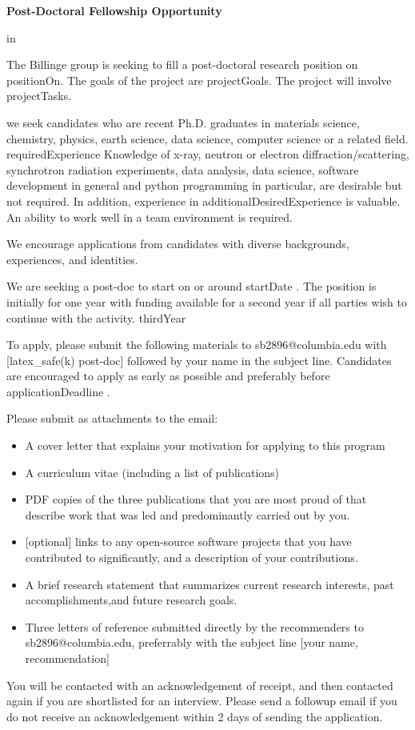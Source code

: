 \documentclass{letter}
\begin{document}
\begin{center}
 {\bf
  Post-Doctoral Fellowship Opportunity
 }
\end{center}
 in 

The Billinge group is seeking to fill a post-doctoral research position on {{positionOn}}.
The goals of the project are {{projectGoals}}.
The project will involve {{projectTasks}}.

we seek candidates who are recent Ph.D. graduates in materials science, chemistry, physics, earth science, data science, computer science or a related field. {{requiredExperience}} Knowledge of x-ray, neutron or electron diffraction/scattering,
synchrotron radiation experiments, data analysis, data science, software development in
general and python programming in particular, are desirable but not required. In addition, experience in {{additionalDesiredExperience}} is valuable.  An ability to work well in a team environment is required. 

We encourage applications from candidates with diverse backgrounds, experiences, and identities.


We are seeking a post-doc to start on or around {{ startDate }}.  The position is initially for one year with funding available for a second year if all parties wish to continue with the activity.  {{thirdYear}}


To apply, please submit the following materials to sb2896@columbia.edu with [{{latex_safe(k)}} post-doc] followed by your name in the subject line.  Candidates are encouraged to apply as early as possible and preferably before {{ applicationDeadline }}.

Please submit as attachments to the email:
\begin{itemize}
\item A cover letter that explains your motivation for applying to this program
\item A curriculum vitae (including a list of publications)
\item PDF copies of the three publications that you are most proud of that describe work that was led and predominantly carried out by you.  
\item {[optional]} links to any open-source software projects that you have contributed to significantly, and a description of your contributions.
\item A brief research statement that summarizes current research interests, past accomplishments,and future research goals. 
\item Three letters of reference submitted directly by the recommenders to sb2896@columbia.edu, preferrably with the subject line [your name, recommendation]
\end{itemize}

You will be contacted with an acknowledgement of receipt, and then contacted again if you are shortlisted for an interview.  Please send a followup email if you do not receive an acknowledgement within 2 days of sending the application.
\end{document}
